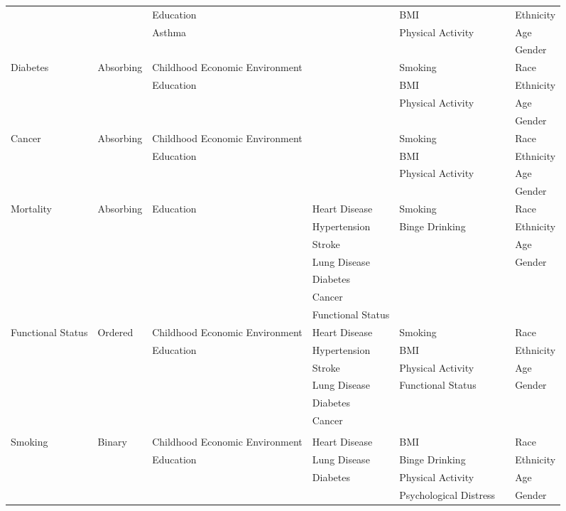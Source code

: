 \begin{table}
\begin{scriptsize}
\begin{tabular}{lllllll}
&           & Education & & BMI &  & Ethnicity \\
&           & Asthma &  & Physical Activity &  & Age \\
&           &        &  &  &  & Gender \\
\midrule		
Diabetes  & Absorbing & Childhood Economic Environment &   & Smoking   &                                & Race \\
&           & Education &  & BMI &  & Ethnicity \\
&           &  &  & Physical Activity &  & Age \\
&           &        &  &  &  & Gender \\
\midrule		
Cancer & Absorbing & Childhood Economic Environment &     & Smoking   &                                & Race \\
&           & Education & & BMI &  & Ethnicity \\
&           &  &  & Physical Activity &  & Age \\
&           &        & &  &  & Gender \\
\midrule
Mortality & Absorbing & Education & Heart Disease & Smoking &  & Race \\
&&  & Hypertension & Binge Drinking  & & Ethnicity \\
&& & Stroke & & & Age \\
&& & Lung Disease & & & Gender \\
&& & Diabetes & & & \\
&& & Cancer & & & \\
&& & Functional Status & & & \\
\midrule	
Functional Status & Ordered & Childhood Economic Environment & Heart Disease & Smoking & & Race \\
			&& Education & Hypertension & BMI &  & Ethnicity \\
			&&  & Stroke & Physical Activity & & Age \\
			&&  &  Lung Disease & Functional Status & & Gender \\
			&&  & Diabetes &  &  & \\
			&&  & Cancer & & & \\
			&&  &   &  &  & \\
\midrule
Smoking & Binary & Childhood Economic Environment & Heart Disease  & BMI & & Race \\
& & Education &  Lung Disease & Binge Drinking & & Ethnicity \\
&  &  & Diabetes & Physical Activity  & & Age \\
&  & &  & Psychological Distress & & Gender \\
\bottomrule
\end{tabular}
\end{scriptsize}
\end{table}

